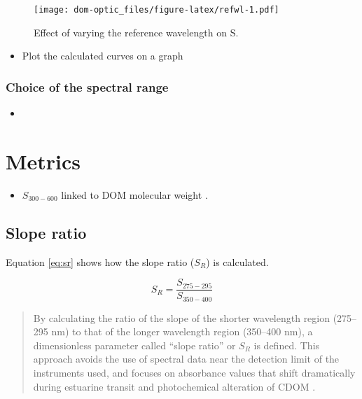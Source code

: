 \documentclass[]{book}
\providecommand{\tightlist}{%
  \setlength{\itemsep}{0pt}\setlength{\parskip}{0pt}}
\begin{document}
\begin{figure}[htbp]
\centering
\texttt{[image: dom-optic\_files/figure-latex/refwl-1.pdf]}
\caption{\label{fig:refwl}Effect of varying the reference wavelength on S.}
\end{figure}

\begin{itemize}
\tightlist
\item
  Plot the calculated curves on a graph
\end{itemize}

\subsubsection{Choice of the spectral
range}\label{choice-of-the-spectral-range}

\begin{itemize}
\tightlist
\item
  \citet{Massicotte2016MC}
\end{itemize}

\section{Metrics}\label{metrics}

\begin{itemize}
\tightlist
\item
  \(S_{300-600}\) linked to DOM molecular weight \citep{Stedmon2015b}.
\end{itemize}

\subsection{Slope ratio}\label{slope-ratio}

Equation \ref{eq:sr} shows how the slope ratio (\(S_R\)) is calculated.

\begin{equation}
S_R = \frac{S_{275-295}}{S_{350-400}}
\label{eq:sr}
\end{equation}

\begin{quote}
By calculating the ratio of the slope of the shorter wavelength region
(275--295 nm) to that of the longer wavelength region (350--400 nm), a
dimensionless parameter called ``slope ratio'' or \(S_R\) is defined.
This approach avoids the use of spectral data near the detection limit
of the instruments used, and focuses on absorbance values that shift
dramatically during estuarine transit and photochemical alteration of
CDOM \citep{Helms2008}.
\end{quote}
\end{document}
